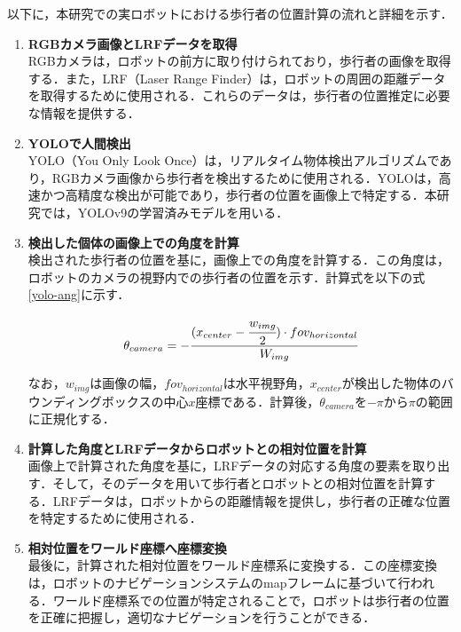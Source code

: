 \newpage

以下に，本研究での実ロボットにおける歩行者の位置計算の流れと詳細を示す．

\begin{enumerate}
  \item \textbf{RGBカメラ画像とLRFデータを取得} \\
  RGBカメラは，ロボットの前方に取り付けられており，歩行者の画像を取得する．また，LRF（Laser Range Finder）は，ロボットの周囲の距離データを取得するために使用される．これらのデータは，歩行者の位置推定に必要な情報を提供する．

  \item \textbf{YOLOで人間検出} \\
  YOLO（You Only Look Once）\cite{redmon2016you-yolo}は，リアルタイム物体検出アルゴリズムであり，RGBカメラ画像から歩行者を検出するために使用される．YOLOは，高速かつ高精度な検出が可能であり，歩行者の位置を画像上で特定する．本研究では，YOLOv9\cite{wang2025yolov9}の学習済みモデルを用いる．

  \item \textbf{検出した個体の画像上での角度を計算} \\
  検出された歩行者の位置を基に，画像上での角度を計算する．この角度は，ロボットのカメラの視野内での歩行者の位置を示す．計算式を以下の式\eqref{yolo-ang}に示す．

  \begin{equation}
    \theta_{camera} = - \cfrac{(x_{center} - \cfrac{w_{img}}{2}) \cdot fov_{horizontal}}{W_{img}} \label{yolo-ang}
  \end{equation}

  なお，$w_{img}$は画像の幅，$fov_{horizontal}$は水平視野角，$x_{center}$が検出した物体のバウンディングボックスの中心$x$座標である．計算後，$\theta_{camera}$を$-\pi \text{から} \pi$の範囲に正規化する．

  \item \textbf{計算した角度とLRFデータからロボットとの相対位置を計算} \\
  画像上で計算された角度を基に，LRFデータの対応する角度の要素を取り出す．そして，そのデータを用いて歩行者とロボットとの相対位置を計算する．LRFデータは，ロボットからの距離情報を提供し，歩行者の正確な位置を特定するために使用される．

  \item \textbf{相対位置をワールド座標へ座標変換} \\
  最後に，計算された相対位置をワールド座標系に変換する．この座標変換は，ロボットのナビゲーションシステムのmapフレームに基づいて行われる．ワールド座標系での位置が特定されることで，ロボットは歩行者の位置を正確に把握し，適切なナビゲーションを行うことができる．
\end{enumerate}

